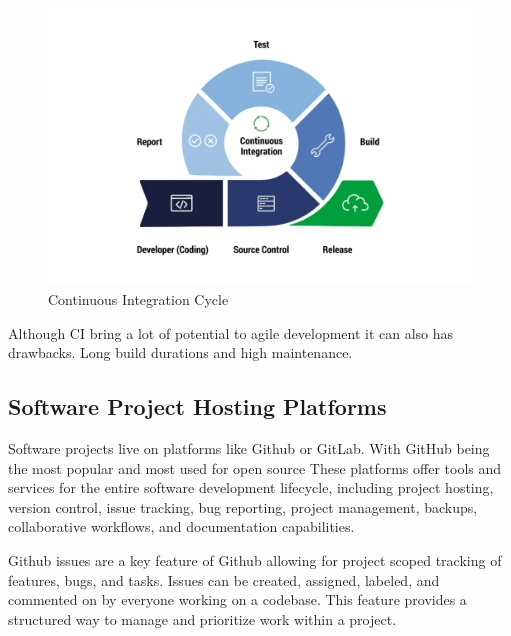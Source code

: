 \begin{figure}[H]
    \centering
    \includegraphics[width=1\textwidth]{images/ci-cycle.png}
    \caption{Continuous Integration Cycle}
    \label{fig:ci-cycle}
\end{figure}

Although CI bring a lot of potential to agile development it can also has drawbacks. Long build durations and high maintenance. %

\subsection{Software Project Hosting Platforms} \label{subsection:Software Project Hosting Platforms}

Software projects live on platforms like Github or GitLab. With GitHub being the most popular and most used for open source %
These platforms offer tools and services for the entire software development lifecycle, including project hosting, version control, issue tracking, bug reporting, project management, backups, collaborative workflows, and documentation capabilities. \cite{abrahamssonAgileSoftwareDevelopment2017}

Github issues are a key feature of Github allowing for project scoped tracking of features, bugs, and tasks. Issues can be created, assigned, labeled, and commented on by everyone working on a codebase. This feature provides a structured way to manage and prioritize work within a project.

